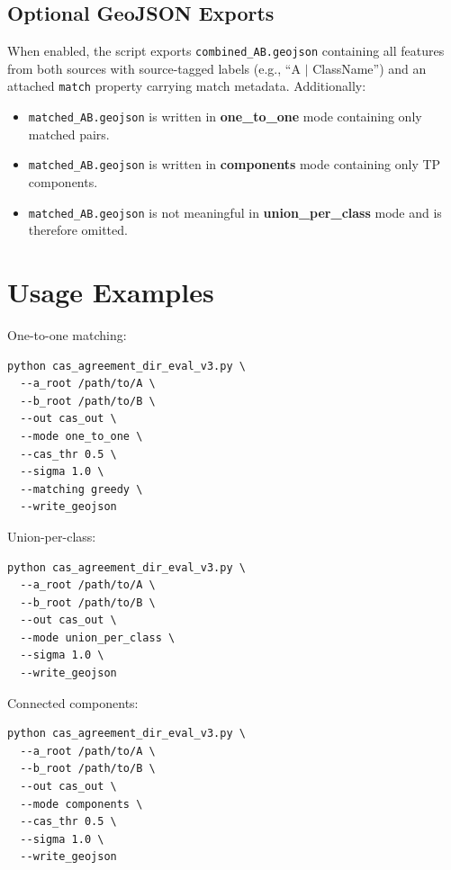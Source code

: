 \documentclass[11pt]{article}
\begin{document}
\subsection{Optional GeoJSON Exports}
When enabled, the script exports \texttt{combined\_AB.geojson} containing all features from both sources with source-tagged labels (e.g., ``A $|$ ClassName'') and an attached \texttt{match} property carrying match metadata.
Additionally:
\begin{itemize}[leftmargin=*]
  \item \texttt{matched\_AB.geojson} is written in \textbf{one\_to\_one} mode containing only matched pairs.
  \item \texttt{matched\_AB.geojson} is written in \textbf{components} mode containing only TP components.
  \item \texttt{matched\_AB.geojson} is not meaningful in \textbf{union\_per\_class} mode and is therefore omitted.
\end{itemize}

\section{Usage Examples}
One-to-one matching:
\begin{lstlisting}
python cas_agreement_dir_eval_v3.py \
  --a_root /path/to/A \
  --b_root /path/to/B \
  --out cas_out \
  --mode one_to_one \
  --cas_thr 0.5 \
  --sigma 1.0 \
  --matching greedy \
  --write_geojson
\end{lstlisting}

Union-per-class:
\begin{lstlisting}
python cas_agreement_dir_eval_v3.py \
  --a_root /path/to/A \
  --b_root /path/to/B \
  --out cas_out \
  --mode union_per_class \
  --sigma 1.0 \
  --write_geojson
\end{lstlisting}

Connected components:
\begin{lstlisting}
python cas_agreement_dir_eval_v3.py \
  --a_root /path/to/A \
  --b_root /path/to/B \
  --out cas_out \
  --mode components \
  --cas_thr 0.5 \
  --sigma 1.0 \
  --write_geojson
\end{lstlisting}
\end{document}
